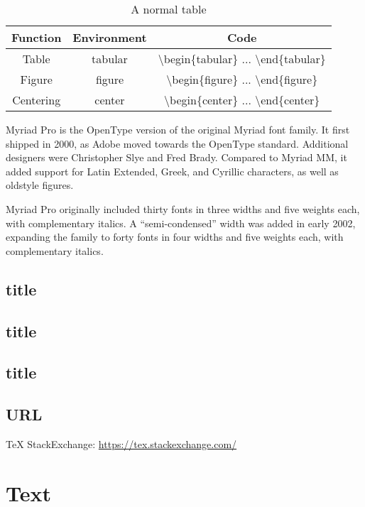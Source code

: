 \documentclass[twoside]{fduthesis-en}
\begin{document}
\begin{table}[h]
  \centering
  \caption{A normal table}
  \begin{tabular}{ccc}
    \hline
    \bfseries Function & \bfseries Environment & \bfseries Code \\
    \hline
    Table     & tabular & \ttfamily \backslash begin\{tabular\} ... \backslash end\{tabular\} \\
    Figure    & figure  & \ttfamily \backslash begin\{figure\}  ... \backslash end\{figure\}  \\
    Centering & center  & \ttfamily \backslash begin\{center\}  ... \backslash end\{center\}  \\
    \hline
  \end{tabular}
\end{table}

Myriad Pro is the OpenType version of the original Myriad font family.
It first shipped in 2000, as Adobe moved towards the OpenType standard.
Additional designers were Christopher Slye and Fred Brady. Compared to
Myriad MM, it added support for Latin Extended, Greek, and Cyrillic
characters, as well as oldstyle figures.

Myriad Pro originally included thirty fonts in three widths and five
weights each, with complementary italics. A ``semi-condensed'' width
was added in early 2002, expanding the family to forty fonts in four
widths and five weights each, with complementary italics.

\section{title}
\kant[1-10]

\section{title}
\kant[21-30]

\section{title}
\kant[31-40]

\section{URL}
\TeX{} StackExchange: \url{https://tex.stackexchange.com/}


\chapter{Text}
\end{document}
